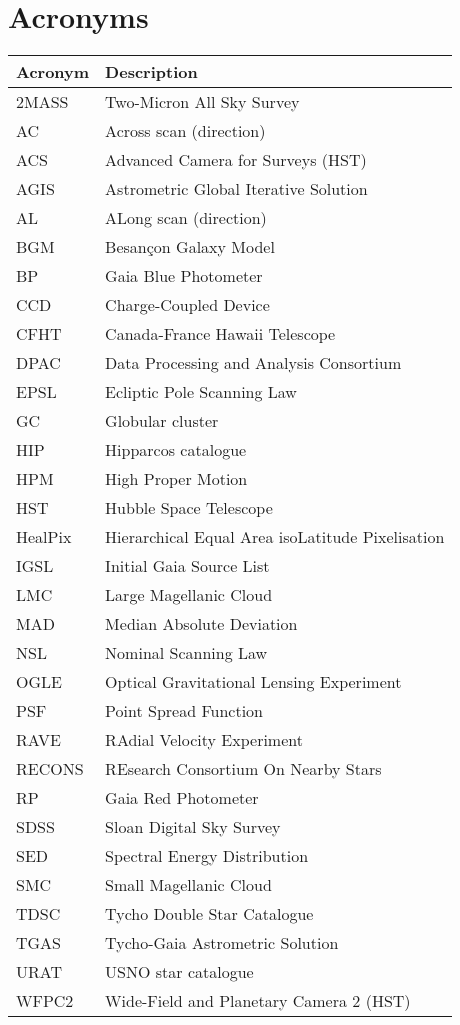 \section{Acronyms}\label{sec:acronyms}
{\small
\begin{tabular}{ll}
\hline\hline
\textbf{Acronym}  &  \textbf{Description}  \\ \hline
2MASS & Two-Micron All Sky Survey \\
AC & Across scan (direction) \\
ACS & Advanced Camera for Surveys (HST) \\
AGIS & Astrometric Global Iterative Solution \\
AL & ALong scan (direction) \\
BGM & Besan{\c{c}}on Galaxy Model \\
BP & Gaia Blue Photometer \\
CCD & Charge-Coupled Device \\
CFHT & Canada-France Hawaii Telescope \\
DPAC & Data Processing and Analysis Consortium \\
EPSL & Ecliptic Pole Scanning Law \\
GC & Globular cluster \\
HIP & Hipparcos catalogue \\
HPM & High Proper Motion \\
HST & Hubble Space Telescope \\
HealPix & Hierarchical Equal Area isoLatitude Pixelisation \\
IGSL & Initial Gaia Source List \\
LMC & Large Magellanic Cloud \\
MAD & Median Absolute Deviation \\
NSL & Nominal Scanning Law \\
OGLE & Optical Gravitational Lensing Experiment \\
PSF & Point Spread Function \\
RAVE & RAdial Velocity Experiment \\
RECONS & REsearch Consortium On Nearby Stars \\
RP & Gaia Red Photometer \\
SDSS & Sloan Digital Sky Survey \\
SED & Spectral Energy Distribution \\
SMC & Small Magellanic Cloud \\
TDSC & Tycho Double Star Catalogue \\
TGAS & Tycho-Gaia Astrometric Solution \\
URAT & USNO star catalogue \\
WFPC2 & Wide-Field and Planetary Camera 2 (HST) \\
\hline
\end{tabular} 
}